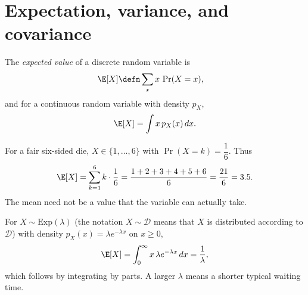 \documentclass[a4paper, 12pt]{book}
\begin{document}
\section{Expectation, variance, and covariance}

\begin{definition}
    The \emph{expected value} of a discrete random variable is
\begin{align}
    \E[X] &\defn \sum_x x \, \Pr(X = x),
\end{align}
and for a continuous random variable with density $p_X$,
\begin{align}
    \E[X] = \int x \, p_X(x) \, dx.
\end{align}
\end{definition}
\begin{example}
    For a fair six-sided die, $X\in\{1,\ldots,6\}$ with $\Pr(X=k)= \dfrac{1}{6}$. Thus
    \begin{align}
        \E[X] = \sum_{k=1}^6 k\cdot\frac16
        = \frac{1+2+3+4+5+6}{6} = \frac{21}{6} = 3.5.
    \end{align}
    The mean need not be a value that the variable can actually take.
\end{example}

\begin{example}
    For $X\sim\mathrm{Exp}(\lambda)$ (the notation $X\sim\mathscr{D}$ means that $X$ is distributed according to $\mathscr{D}$) with density
    $p_X(x)=\lambda e^{-\lambda x}$ on $x\geq0$,
    \begin{align}
        \E[X] = \int_0^\infty x\,\lambda e^{-\lambda x}\,dx
        = \frac{1}{\lambda},
    \end{align}
    which follows by integrating by parts. A larger $\lambda$ means a shorter
    typical waiting time.
\end{example}
\end{document}
